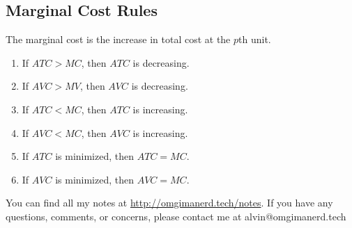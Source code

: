 \documentclass{article}
\begin{document}
\subsection{Marginal Cost Rules}
The marginal cost is the increase in total cost at the \( p \)th unit.
\begin{enumerate}
  \item If \( ATC > MC \), then \( ATC \) is decreasing.
  \item If \( AVC > MV \), then \( AVC \) is decreasing.
  \item If \( ATC < MC \), then \( ATC \) is increasing.
  \item If \( AVC < MC \), then \( AVC \) is increasing.
  \item If \( ATC \) is minimized, then \( ATC = MC \).
  \item If \( AVC \) is minimized, then \( AVC = MC \).
\end{enumerate}

\begin{center}
  You can find all my notes at \url{http://omgimanerd.tech/notes}. If you have
  any questions, comments, or concerns, please contact me at
  alvin@omgimanerd.tech
\end{center}
\end{document}

